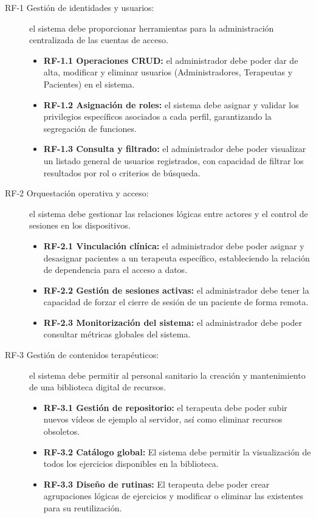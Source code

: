 \begin{description}
    \item[RF-1 Gestión de identidades y usuarios:] el sistema debe proporcionar herramientas para la administración centralizada de las cuentas de acceso.
    \begin{itemize}
        \item \textbf{RF-1.1 Operaciones CRUD:} el administrador debe poder dar de alta, modificar y eliminar usuarios (Administradores, Terapeutas y Pacientes) en el sistema.
        \item \textbf{RF-1.2 Asignación de roles:} el sistema debe asignar y validar los privilegios específicos asociados a cada perfil, garantizando la segregación de funciones.
        \item \textbf{RF-1.3 Consulta y filtrado:} el administrador debe poder visualizar un listado general de usuarios registrados, con capacidad de filtrar los resultados por rol o criterios de búsqueda.
    \end{itemize}

    \item[RF-2 Orquestación operativa y acceso:] el sistema debe gestionar las relaciones lógicas entre actores y el control de sesiones en los dispositivos.
    \begin{itemize}
        \item \textbf{RF-2.1 Vinculación clínica:} el administrador debe poder asignar y desasignar pacientes a un terapeuta específico, estableciendo la relación de dependencia para el acceso a datos.
        \item \textbf{RF-2.2 Gestión de sesiones activas:} el administrador debe tener la capacidad de forzar el cierre de sesión de un paciente de forma remota.
        \item \textbf{RF-2.3 Monitorización del sistema:} el administrador debe poder consultar métricas globales del sistema.
    \end{itemize}

    \item[RF-3 Gestión de contenidos terapéuticos:] el sistema debe permitir al personal sanitario la creación y mantenimiento de una biblioteca digital de recursos.
    \begin{itemize}
        \item \textbf{RF-3.1 Gestión de repositorio:} el terapeuta debe poder subir nuevos vídeos de ejemplo al servidor, así como eliminar recursos obsoletos.
        \item \textbf{RF-3.2 Catálogo global:} El sistema debe permitir la visualización de todos los ejercicios disponibles en la biblioteca.
        \item \textbf{RF-3.3 Diseño de rutinas:} El terapeuta debe poder crear agrupaciones lógicas de ejercicios y modificar o eliminar las existentes para su reutilización.
    \end{itemize}


\end{description}
